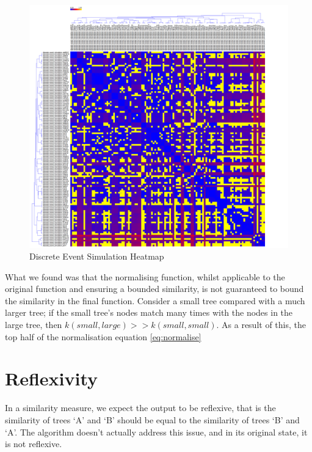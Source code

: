 \begin{figure}[h!]

	\centering
		\includegraphics[width=1.2\textwidth]{Figures/DESHeatmapOverflow}
	\caption{Discrete Event Simulation Heatmap}
	\label{fig:DESHeatmap}

\end{figure}

What we found was that the normalising function, whilst applicable to the original
function\cite{NLPKernel} and ensuring a bounded similarity, is not 
guaranteed to bound the similarity in the final function. Consider a small tree
compared with a much larger tree; if the small tree's nodes match many times with
the nodes in the large tree, then $k(small, large) >> k(small, small)$. As a result
of this, the top half of the normalisation equation \cref{eq:normalise}

\section{Reflexivity}
In a similarity measure, we expect the output to be reflexive, that is the similarity of trees `A' and `B' should be equal to the similarity of trees `B' and `A'. The algorithm doesn’t actually address this issue, and in its original state, it is not reflexive.

